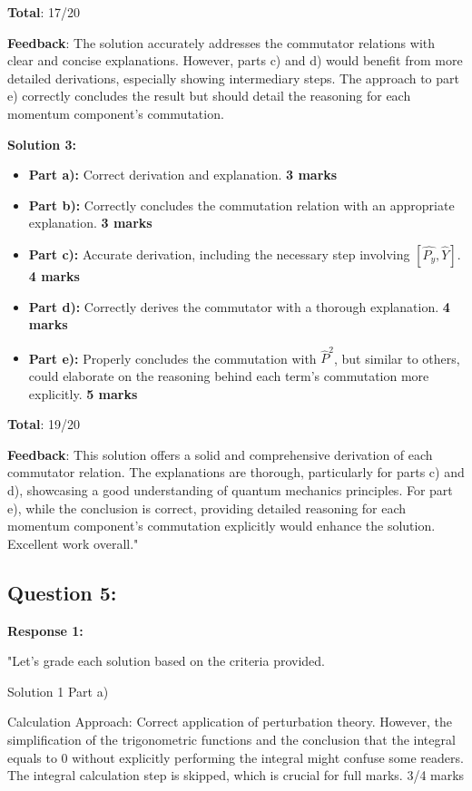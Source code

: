 \documentclass[a4paper,11pt]{article}
\begin{document}
\textbf{Total}: 17/20

\textbf{Feedback}: The solution accurately addresses the commutator relations with clear and concise explanations. However, parts c) and d) would benefit from more detailed derivations, especially showing intermediary steps. The approach to part e) correctly concludes the result but should detail the reasoning for each momentum component’s commutation.

\textbf{Solution 3:}

\begin{itemize}
    \item \textbf{Part a):} Correct derivation and explanation. \textbf{3 marks}
    \item \textbf{Part b):} Correctly concludes the commutation relation with an appropriate explanation. \textbf{3 marks}
    \item \textbf{Part c):} Accurate derivation, including the necessary step involving \( [ \hat{P_{y}}, \hat{Y} ] \). \textbf{4 marks}
    \item \textbf{Part d):} Correctly derives the commutator with a thorough explanation. \textbf{4 marks}
    \item \textbf{Part e):} Properly concludes the commutation with \( \hat{P}^{2} \), but similar to others, could elaborate on the reasoning behind each term's commutation more explicitly. \textbf{5 marks}
\end{itemize}

\textbf{Total}: 19/20

\textbf{Feedback}: This solution offers a solid and comprehensive derivation of each commutator relation. The explanations are thorough, particularly for parts c) and d), showcasing a good understanding of quantum mechanics principles. For part e), while the conclusion is correct, providing detailed reasoning for each momentum component’s commutation explicitly would enhance the solution. Excellent work overall."

\subsection*{Question 5:}

\textbf{Response 1:}

"Let's grade each solution based on the criteria provided.

Solution 1
Part a)

Calculation Approach: Correct application of perturbation theory. However, the simplification of the trigonometric functions and the conclusion that the integral equals to 0 without explicitly performing the integral might confuse some readers. The integral calculation step is skipped, which is crucial for full marks. 3/4 marks
\end{document}
